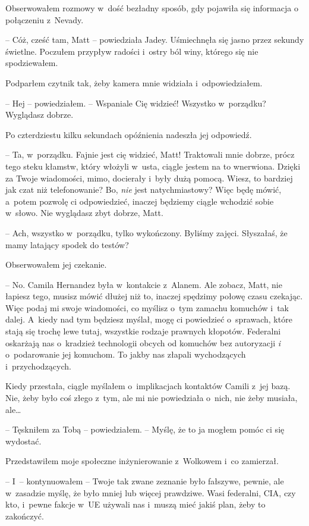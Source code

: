 \documentclass[oneside,polish,12pt,sfheadings]{mwbk}
\begin{document}
Obserwowałem rozmowy w~dość bezładny sposób, gdy pojawiła się informacja
o połączeniu z~Nevady.

-- Cóż, cześć tam, Matt -- powiedziała Jadey. Uśmiechnęła się jasno przez
sekundy świetlne. Poczułem przypływ radości i~ostry ból winy, którego
się nie spodziewałem.

Podparłem czytnik tak, żeby kamera mnie widziała i~odpowiedziałem.

-- Hej -- powiedziałem. -- Wspaniale Cię widzieć! Wszystko w~porządku?
Wyglądasz dobrze.

Po czterdziestu kilku sekundach opóźnienia nadeszła jej odpowiedź.

-- Ta, w~porządku. Fajnie jest cię widzieć, Matt! Traktowali mnie dobrze,
prócz tego steku kłamstw, który włożyli w~usta, ciągle jestem na to
wnerwiona. Dzięki za Twoje wiadomości, mimo, docierały i~były dużą
pomocą. Wiesz, to bardziej jak czat niż telefonowanie? Bo, \emph{nie}
jest natychmiastowy? Więc będę mówić, a~potem pozwolę ci odpowiedzieć,
inaczej będziemy ciągle wchodzić sobie w~słowo. Nie wyglądasz zbyt
dobrze, Matt.

-- Ach, wszystko w~porządku, tylko wykończony. Byliśmy zajęci. Słyszałaś,
że mamy latający spodek do testów?

Obserwowałem jej czekanie.

-- No. Camila Hernandez była w~kontakcie z~Alanem. Ale zobacz, Matt, nie
łapiesz tego, musisz mówić dłużej niż to, inaczej spędzimy połowę czasu
czekając. Więc podaj mi swoje wiadomości, co myślisz o~tym zamachu
komuchów i~tak dalej. A~kiedy nad tym będziesz myślał, mogę ci
powiedzieć o~sprawach, które stają się trochę lewe tutaj, wszystkie
rodzaje prawnych kłopotów. Federalni oskarżają nas o~kradzież
technologii obcych od komuchów bez autoryzacji \emph{i} o~podarowanie
jej komuchom. To jakby nas złapali wychodzących i~przychodzących.

Kiedy przestała, ciągle myślałem o~implikacjach kontaktów Camili z~jej
bazą. Nie, żeby było coś złego z~tym, ale mi nie powiedziała o~nich, nie
żeby musiała, ale\ldots

-- Tęskniłem za Tobą -- powiedziałem. -- Myślę, że to ja mogłem pomóc ci
się wydostać.

Przedstawiłem moje społeczne inżynierowanie z~Wolkowem i~co zamierzał.

-- I~-- kontynuowałem -- Twoje tak zwane zeznanie było fałszywe, pewnie,
ale w~zasadzie myślę, że było mniej lub więcej prawdziwe. Wasi
federalni, CIA, czy kto, i~pewne fakcje w~UE używali nas i~muszą mieć
jakiś plan, żeby to zakończyć.
\end{document}
